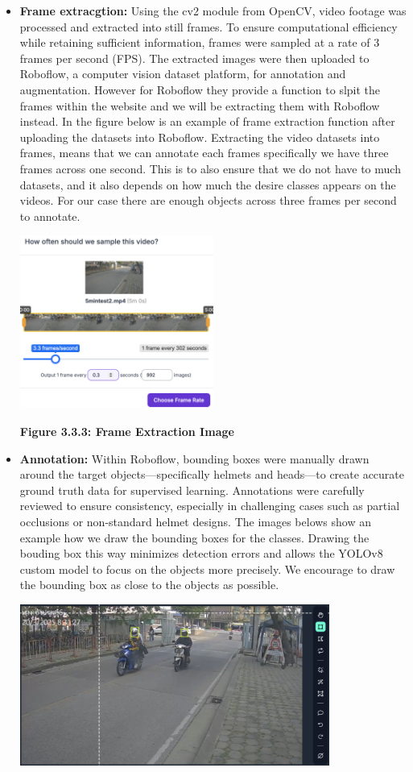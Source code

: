 \begin{itemize}
	\item \textbf{Frame extracgtion:} Using the cv2 module from OpenCV, video footage was processed and extracted into still frames. To ensure computational efficiency while retaining sufficient information, frames were sampled at a rate of 3 frames per second (FPS). The extracted images were then uploaded to Roboflow, a computer vision dataset platform, for annotation and augmentation. However for Roboflow they provide a function to slpit the frames within the website and we will be extracting them with Roboflow instead. In the figure below is an example of frame extraction function after uploading the datasets into Roboflow. Extracting the video datasets into frames, means that we can annotate each frames specifically we have three frames across one second. This is to also ensure that we do not have to much datasets, and it also depends on how much the desire classes appears on the videos. For our case there are enough objects across three frames per second to annotate.
	\begin{center}
		\includegraphics[width=0.5\textwidth]{Frameex.png}
		
		\vspace{0.5em}
		\textbf{Figure 3.3.3: Frame Extraction Image}
	\end{center}
	
	\item\textbf{Annotation:} Within Roboflow, bounding boxes were manually drawn around the target objects—specifically helmets and heads—to create accurate ground truth data for supervised learning. Annotations were carefully reviewed to ensure consistency, especially in challenging cases such as partial occlusions or non-standard helmet designs. The images belows show an example how we draw the bounding boxes for the classes. Drawing the bouding box this way minimizes detection errors and allows the YOLOv8 custom model to focus on the objects more precisely. We encourage to draw the bounding box as close to the objects as possible.
	\begin{center}
		\includegraphics[width=0.8\textwidth]{Anotate.png}
		

\end{center}
\end{itemize}
